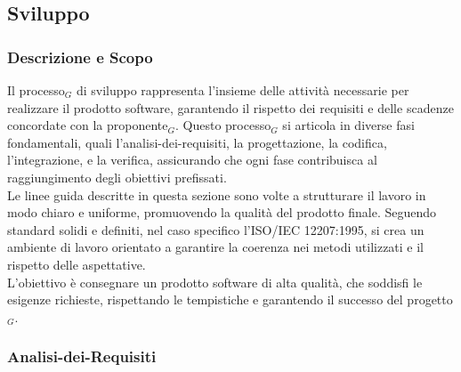 \documentclass[10pt]{article}
\begin{document}
\begin{justify}
    \subsection{Sviluppo}

    \subsubsection{Descrizione e Scopo}
    Il processo$_G$ di sviluppo rappresenta l'insieme delle attività necessarie per realizzare il prodotto software, garantendo il rispetto dei requisiti e delle scadenze concordate con la proponente$_G$. Questo processo$_G$ si articola in diverse fasi fondamentali, quali l'analisi-dei-requisiti, la progettazione, la codifica, l'integrazione, e la verifica, assicurando che ogni fase contribuisca al raggiungimento degli obiettivi prefissati.\\
    Le linee guida descritte in questa sezione sono volte a strutturare il lavoro in modo chiaro e uniforme, promuovendo la qualità del prodotto finale. Seguendo standard solidi e definiti, nel caso specifico l'ISO/IEC 12207:1995, si crea un ambiente di lavoro orientato a garantire la coerenza nei metodi utilizzati e il rispetto delle aspettative.\\
    L'obiettivo è consegnare un prodotto software di alta qualità, che soddisfi le esigenze richieste, rispettando le tempistiche e garantendo il successo del progetto$_G$.\\

    \subsubsection{Analisi-dei-Requisiti}
    \label{analisi}

\end{justify}
\end{document}
